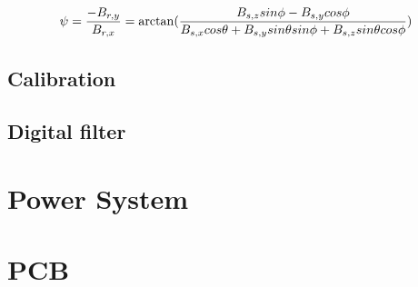 \begin{equation}
    \label{eq:yaw}
    \psi =  \frac{-B_{r,y}}{B_{r,x}} \newline
        =\arctan (\frac{B_{s,z} sin\phi - B_{s,y} cos\phi }  {B_{s,x} cos\theta + B_{s,y} sin\theta sin\phi + B_{s,z} sin\theta cos\phi})
\end{equation}











\subsection{Calibration}

\subsection{Digital filter}


\section{Power System}

\section{PCB}


